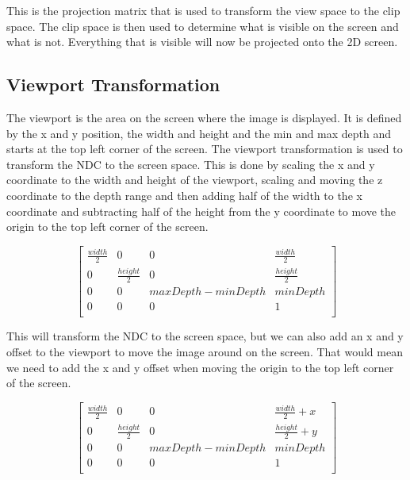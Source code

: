 \documentclass[12pt]{report} \usepackage{preamble}
\begin{document}
This is the projection matrix that is used to transform the view space to the clip space. The clip space is then used to
determine what is visible on the screen and what is not. Everything that is visible will now be projected onto the 2D screen.

\subsection{Viewport Transformation}

The viewport is the area on the screen where the image is displayed. It is defined by the x and y position, the width and height and the
min and max depth and starts at the top left corner of the screen. The viewport transformation is used to transform the NDC to the screen space.
This is done by scaling the x and y coordinate to the width and height of the viewport,
scaling and moving the z coordinate to the depth range and then adding
half of the width to the x coordinate and subtracting half of the height from the y coordinate
to move the origin to the top left corner of the screen.

\[
	\begin{bmatrix}
		\frac{width}{2} & 0                & 0                   & \frac{width}{2}  \\
		0               & \frac{height}{2} & 0                   & \frac{height}{2} \\
		0               & 0                & maxDepth - minDepth & minDepth         \\
		0               & 0                & 0                   & 1                \\
	\end{bmatrix}
\]

This will transform the NDC to the screen space, but we can also add an x and y offset to the viewport to move the image around on the screen.
That would mean we need to add the x and y offset when moving the origin to the top left corner of the screen.

\[
	\begin{bmatrix}
		\frac{width}{2} & 0                & 0                   & \frac{width}{2} + x  \\
		0               & \frac{height}{2} & 0                   & \frac{height}{2} + y \\
		0               & 0                & maxDepth - minDepth & minDepth             \\
		0               & 0                & 0                   & 1                    \\
	\end{bmatrix}
\]
\end{document}
